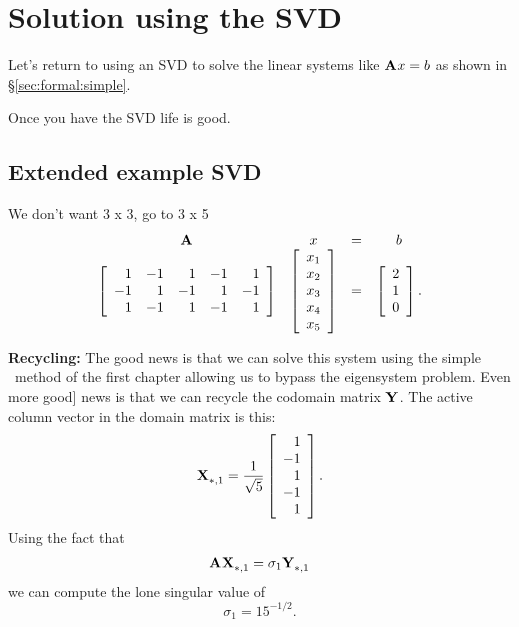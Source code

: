 \section{Solution using the SVD}
Let's return to using an SVD to solve the linear systems like $\ls$ as shown in \S\eqref{sec:formal:simple}.

Once you have the SVD life is good.
 
\subsection{Extended example SVD}
We don't want 3 x 3, go to 3 x 5
\begin{equation}
  \begin{array}{cccc}
    \A{}&x &=& b\\
    \mat{rrrrr}
    {
     1 & -1 &  1 & -1 &  1\\
    -1 &  1 & -1 &  1 & -1\\
     1 & -1 &  1 & -1 &  1\\
    }
    &
    \mat{c}{x_{1}\\x_{2}\\x_{3}\\x_{4}\\x_{5}}
    &=& \phivector.
  \end{array}
\end{equation}

\textbf{Recycling:} The good news is that we can solve this system using the simple \svdl \ method of the first chapter allowing us to bypass the eigensystem problem. Even more good] news is that we can recycle the codomain matrix $\Y{}$. The active column vector in the domain matrix is this:
\begin{equation}
  \X{}_{*,1} = \sfive\mat{r}{1 \\ -1 \\  1 \\ -1 \\  1}.
\end{equation}
Using the fact that
\begin{equation}
  \begin{split}
    \A{}\X{}_{*,1}=\sigma_{1}\Y{}_{*,1}
  \end{split}
\end{equation}
we can compute the lone singular value of
\begin{equation}
  \sigma_{1} = 15^{-1/2}.
\end{equation}

